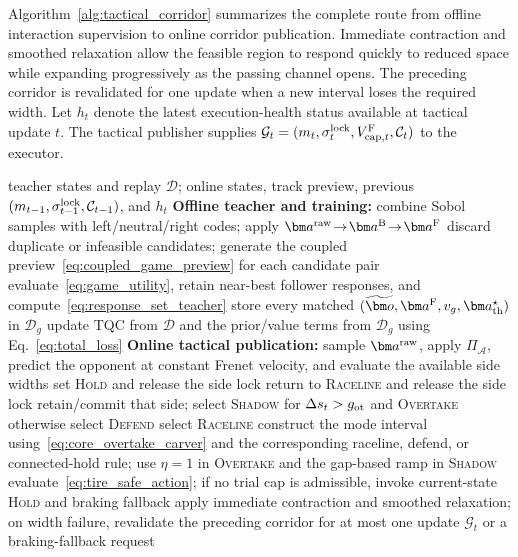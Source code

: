 \documentclass[sensors,article,submit,moreauthors]{Definitions/mdpi}
\begin{document}
Algorithm~\ref{alg:tactical_corridor} summarizes the complete route from
offline interaction supervision to online corridor publication. Immediate
contraction and smoothed relaxation allow the feasible region to respond
quickly to reduced space while expanding progressively as the passing channel
opens. The preceding corridor is revalidated for one update when a new
interval loses the required width.
Let $h_t$ denote the latest execution-health status available at tactical
update $t$. The tactical publisher supplies
$\mathcal G_t=(m_t,\sigma_t^{\rm lock},V_{{\rm cap},t}^{\rm F},\mathcal C_t)$
to the executor.

\begin{algorithm}[!tbp]
\caption{Game-supervised tactical-corridor policy}
\label{alg:tactical_corridor}
\footnotesize
\begin{algorithmic}[1]
\REQUIRE teacher states and replay $\mathcal D$; online states, track preview,
previous $(m_{t-1},\sigma_{t-1}^{\rm lock},\mathcal C_{t-1})$, and $h_t$
\STATE \textbf{Offline teacher and training:}
\STATE combine Sobol samples with left/neutral/right codes; apply
$\bm a^{\rm raw}\!\rightarrow\!\bm a^{\rm B}\!\rightarrow\!\bm a^{\rm F}$
\STATE discard duplicate or infeasible candidates; generate the coupled
preview~\eqref{eq:coupled_game_preview} for each candidate pair
\STATE evaluate~\eqref{eq:game_utility}, retain near-best follower responses,
and compute~\eqref{eq:response_set_teacher}
\STATE store every matched
$(\widetilde{\bm o},\bm a^{\rm F},v_g,\bm a_{\rm th}^{\star})$
in $\mathcal D_g$
\ENDFOR
\STATE update TQC from $\mathcal D$ and the prior/value terms from $\mathcal D_g$
using Eq.~\eqref{eq:total_loss}
\STATE \textbf{Online tactical publication:}
\STATE sample $\bm a^{\rm raw}$, apply $\Pi_{\mathcal A}$, predict the opponent
at constant Frenet velocity, and evaluate the available side widths
\STATE set \textsc{Hold} and release the side lock
\STATE return to \textsc{Raceline} and release the side lock
\STATE retain/commit that side; select \textsc{Shadow} for $\Delta s_t>g_{\rm ot}$
and \textsc{Overtake} otherwise
\STATE select \textsc{Defend}
\ELSE
\STATE select \textsc{Raceline}
\ENDIF
\STATE construct the mode interval using~\eqref{eq:core_overtake_carver} and
the corresponding raceline, defend, or connected-hold rule; use
$\eta=1$ in \textsc{Overtake} and the gap-based ramp in \textsc{Shadow}
\STATE evaluate~\eqref{eq:tire_safe_action}; if no trial cap is admissible,
invoke current-state \textsc{Hold} and braking fallback
\STATE apply immediate contraction and smoothed relaxation; on width failure,
revalidate the preceding corridor for at most one update
\RETURN $\mathcal G_t$ or a braking-fallback request
\end{algorithmic}
\end{algorithm}
\end{document}
